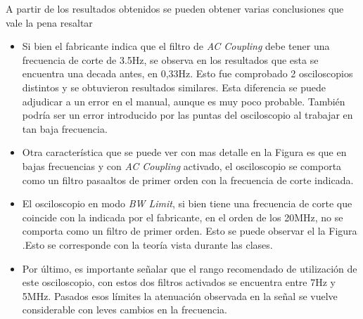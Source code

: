 	A partir de los resultados obtenidos se pueden obtener varias conclusiones que vale la pena resaltar
	\begin{itemize}
		\item Si bien el fabricante indica que el filtro de \textit{AC Coupling} debe tener una frecuencia de corte de 3.5Hz, se observa en los resultados que esta se encuentra una decada antes, en 0,33Hz. Esto fue comprobado 2 osciloscopios distintos y se obtuvieron resultados similares. Esta diferencia se puede adjudicar a un error en el manual, aunque es muy poco probable. Tambi\'en podr\'ia ser un error introducido por las puntas del osciloscopio al trabajar en tan baja frecuencia.
		\item Otra caracter\'istica que se puede ver con mas detalle en la Figura 
		es que en bajas frecuencias y con \textit{AC Coupling} activado, el osciloscopio se comporta como un filtro pasaaltos de primer orden con la frecuencia de corte indicada.
		\item El osciloscopio en modo \textit{BW Limit}, si bien tiene una frecuencia de corte que coincide con la indicada por el fabricante, en el orden de los 20MHz, no se comporta como un filtro de primer orden. Esto se puede observar el la Figura
		 .Esto se corresponde con la teor\'ia vista durante las clases.
		 \item Por \'ultimo, es importante se\~nalar que el rango recomendado de utilizaci\'on de este osciloscopio, con estos dos filtros activados se encuentra entre 7Hz y 5MHz. Pasados esos l\'imites la atenuaci\'on observada en la se\~nal se vuelve considerable con leves cambios en la frecuencia.
	\end{itemize}
